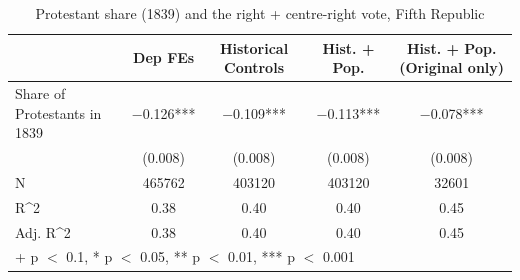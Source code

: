 \begin{table}
\centering
\caption{Protestant share (1839) and the right + centre-right vote, Fifth Republic}
\centering
\begin{tabular}[t]{lcccc}
\toprule
  & Dep FEs & Historical Controls & Hist. + Pop. & Hist. + Pop. (Original only)\\
\midrule
Share of Protestants in 1839 & \num{-0.126}*** & \num{-0.109}*** & \num{-0.113}*** & \num{-0.078}***\\
 & (\num{0.008}) & (\num{0.008}) & (\num{0.008}) & (\num{0.008})\\
\midrule
N & \num{465762} & \num{403120} & \num{403120} & \num{32601}\\
R\textasciicircum{}2 & \num{0.38} & \num{0.40} & \num{0.40} & \num{0.45}\\
Adj. R\textasciicircum{}2 & \num{0.38} & \num{0.40} & \num{0.40} & \num{0.45}\\
\bottomrule
\multicolumn{5}{l}{\rule{0pt}{1em}+ p $<$ 0.1, * p $<$ 0.05, ** p $<$ 0.01, *** p $<$ 0.001}\\
\end{tabular}
\end{table}
